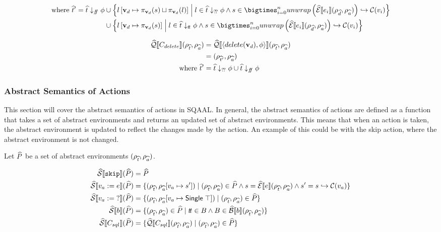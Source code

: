 \begin{align}
    \text{where } \abstable' = \ab{t} \downarrow_{\false} \phi
    & \cup \left\{ l\left[ \mathbf{v}_d \mapsto \pi_{\mathbf{v}_d}(s) \sqcup \pi_{\mathbf{v}_d}(l) \right] \;\middle|\; l \in \ab{t} \downarrow_{\unknown} \phi \land s \in \bigtimes_{i = 0}^{n} unwrap\left( \absexpsem{e_i}(\rho_{\ab{d}}, \rho_{\ab{a}}) \right) \into \lookupcl(v_i)\right\} \\
    & \cup \left\{ l\left[ \mathbf{v}_d \mapsto \pi_{\mathbf{v}_d}(s) \right] \;\middle|\; l \in \ab{t} \downarrow_{\true} \phi \land s \in \bigtimes_{i = 0}^{n} unwrap\left( \absexpsem{e_i}(\rho_{\ab{d}}, \rho_{\ab{a}}) \right) \into \lookupcl(v_i)\right\} \\
\end{align}

\begin{align*}
    \widehat{\mathcal{Q}}\llbracket C_{delete} \rrbracket(\rho_{\widehat{t}}, \rho_{\widehat{a}})
    &= \widehat{\mathcal{Q}}\llbracket \langle delete(\mathbf{v}_d), \phi \rangle \rrbracket (\rho_{\widehat{t}}, \rho_{\widehat{a}}) \\
    &= (\rho_{\widehat{t}'}, \rho_{\widehat{a}}) \\
    \text{where } \widehat{t}' &= \widehat{t} \downarrow_{?\!?} \phi \cup \widehat{t} \downarrow_{f\!\!f} \phi
\end{align*}

\subsubsection{Abstract Semantics of Actions}
This section will cover the abstract semantics of actions in SQAAL.
In general, the abstract semantics of actions are defined as a function that takes a set of abstract environments and returns an updated set of abstract environments.
This means that when an action is taken, the abstract environment is updated to reflect the changes made by the action.
An example of this could be with the skip action, where the abstract environment is not changed.


Let $\widehat{P}$ be a set of abstract environments $(\rho_{\widehat{t}}, \rho_{\widehat{a}})$.

\begin{align}
    \widehat{\mathcal{S}} \llbracket \texttt{skip} \rrbracket(\widehat{P}) &= \widehat{P} \\
    \widehat{\mathcal{S}} \llbracket v_a := e \rrbracket(\widehat{P}) &= \{(\rho_{\widehat{t}}, \rho_{\widehat{a}}[v_a \mapsto s']) \mid (\rho_{\widehat{t}}, \rho_{\widehat{a}}) \in \widehat{P} \land s = \widehat{\mathcal{E}}\llbracket e \rrbracket(\rho_{\widehat{t}}, \rho_{\widehat{a}}) \land s' = s \hookrightarrow \mathcal{C}(v_a) \} \\
    \widehat{\mathcal{S}} \llbracket v_a := \; ? \rrbracket(\widehat{P}) &= \{(\rho_{\widehat{t}}, \rho_{\widehat{a}}[v_a \mapsto \mathsf{Single} \; \top]) \mid (\rho_{\widehat{t}}, \rho_{\widehat{a}}) \in \widehat{P} \} \\
    \widehat{\mathcal{S}} \llbracket b \rrbracket(\widehat{P}) &= \{ (\rho_{\widehat{t}}, \rho_{\widehat{a}}) \in \widehat{P} \mid t\!t \in B \land B \in \widehat{\mathcal{B}}\llbracket b \rrbracket(\rho_{\widehat{t}}, \rho_{\widehat{a}}) \} \\
    \widehat{\mathcal{S}} \llbracket C_{sql} \rrbracket(\widehat{P}) &= \{\widehat{\mathcal{Q}}\llbracket C_{sql} \rrbracket(\rho_{\widehat{t}}, \rho_{\widehat{a}}) \mid (\rho_{\widehat{t}}, \rho_{\widehat{a}}) \in \widehat{P} \}
\end{align}

